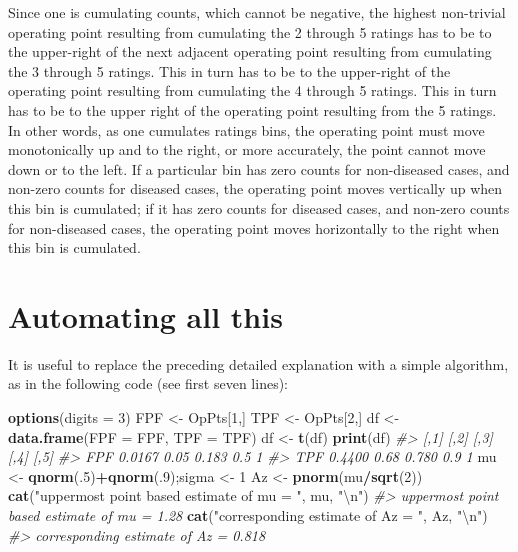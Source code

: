 \documentclass[
]{book}
\newenvironment{Shaded}{\begin{snugshade}}{\end{snugshade}}
\newcommand{\CharTok}[1]{\textcolor[rgb]{0.31,0.60,0.02}{#1}}
\newcommand{\CommentTok}[1]{\textcolor[rgb]{0.56,0.35,0.01}{\textit{#1}}}
\newcommand{\DataTypeTok}[1]{\textcolor[rgb]{0.13,0.29,0.53}{#1}}
\newcommand{\DecValTok}[1]{\textcolor[rgb]{0.00,0.00,0.81}{#1}}
\newcommand{\KeywordTok}[1]{\textcolor[rgb]{0.13,0.29,0.53}{\textbf{#1}}}
\newcommand{\NormalTok}[1]{#1}
\newcommand{\OperatorTok}[1]{\textcolor[rgb]{0.81,0.36,0.00}{\textbf{#1}}}
\newcommand{\StringTok}[1]{\textcolor[rgb]{0.31,0.60,0.02}{#1}}
\begin{document}
Since one is cumulating counts, which cannot be negative, the highest non-trivial operating point resulting from cumulating the 2 through 5 ratings has to be to the upper-right of the next adjacent operating point resulting from cumulating the 3 through 5 ratings. This in turn has to be to the upper-right of the operating point resulting from cumulating the 4 through 5 ratings. This in turn has to be to the upper right of the operating point resulting from the 5 ratings. In other words, as one cumulates ratings bins, the operating point must move monotonically up and to the right, or more accurately, the point cannot move down or to the left. If a particular bin has zero counts for non-diseased cases, and non-zero counts for diseased cases, the operating point moves vertically up when this bin is cumulated; if it has zero counts for diseased cases, and non-zero counts for non-diseased cases, the operating point moves horizontally to the right when this bin is cumulated.

\hypertarget{binary-task-automating}{%
\section{Automating all this}\label{binary-task-automating}}

It is useful to replace the preceding detailed explanation with a simple algorithm, as in the following code (see first seven lines):

\begin{Shaded}
\begin{Highlighting}[]
\KeywordTok{options}\NormalTok{(}\DataTypeTok{digits =} \DecValTok{3}\NormalTok{)}
\NormalTok{FPF <-}\StringTok{ }\NormalTok{OpPts[}\DecValTok{1}\NormalTok{,]}
\NormalTok{TPF <-}\StringTok{ }\NormalTok{OpPts[}\DecValTok{2}\NormalTok{,]}
\NormalTok{df <-}\StringTok{ }\KeywordTok{data.frame}\NormalTok{(}\DataTypeTok{FPF =}\NormalTok{ FPF, }\DataTypeTok{TPF =}\NormalTok{ TPF)}
\NormalTok{df <-}\StringTok{ }\KeywordTok{t}\NormalTok{(df)}
\KeywordTok{print}\NormalTok{(df)}
\CommentTok{#>       [,1] [,2]  [,3] [,4] [,5]}
\CommentTok{#> FPF 0.0167 0.05 0.183  0.5    1}
\CommentTok{#> TPF 0.4400 0.68 0.780  0.9    1}
\NormalTok{mu <-}\StringTok{ }\KeywordTok{qnorm}\NormalTok{(.}\DecValTok{5}\NormalTok{)}\OperatorTok{+}\KeywordTok{qnorm}\NormalTok{(.}\DecValTok{9}\NormalTok{);sigma <-}\StringTok{ }\DecValTok{1}
\NormalTok{Az <-}\StringTok{ }\KeywordTok{pnorm}\NormalTok{(mu}\OperatorTok{/}\KeywordTok{sqrt}\NormalTok{(}\DecValTok{2}\NormalTok{))}
\KeywordTok{cat}\NormalTok{(}\StringTok{"uppermost point based estimate of mu = "}\NormalTok{, mu, }\StringTok{"}\CharTok{\textbackslash{}n}\StringTok{"}\NormalTok{)}
\CommentTok{#> uppermost point based estimate of mu =  1.28}
\KeywordTok{cat}\NormalTok{(}\StringTok{"corresponding estimate of Az = "}\NormalTok{, Az, }\StringTok{"}\CharTok{\textbackslash{}n}\StringTok{"}\NormalTok{)}
\CommentTok{#> corresponding estimate of Az =  0.818}
\end{Highlighting}
\end{Shaded}
\end{document}
